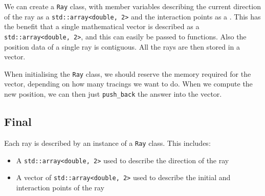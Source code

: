\documentclass{article}
\begin{document}
We can create a \texttt{Ray} class, with member variables describing the current direction of the ray as a \texttt{std::array<double, 2>} and the interaction points as a . This has the benefit that a single mathematical vector is described as a \texttt{std::array<double, 2>}, and this can easily be passed to functions. Also the position data of a single ray is contiguous. All the rays are then stored in a vector.

When initialising the \texttt{Ray} class, we should reserve the memory required for the vector, depending on how many tracings we want to do. When we compute the new position, we can then just \texttt{push\_back} the answer into the vector.

\subsection{Final}
Each ray is described by an instance of a \texttt{Ray} class. This includes:
\begin{itemize}
    \item A \texttt{std::array<double, 2>} used to describe the direction of the ray
    \item A vector of \texttt{std::array<double, 2>} used to describe the initial and interaction points of the ray
\end{itemize}
\end{document}
